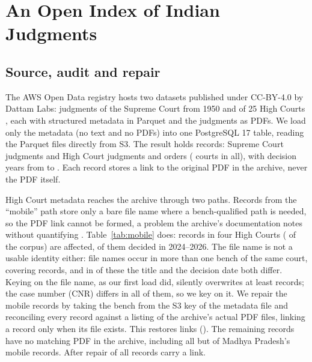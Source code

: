 \documentclass[conference]{IEEEtran}
\begin{document}
\section{An Open Index of Indian Judgments}
\label{sec:corpus}
\subsection{Source, audit and repair}
The AWS Open Data registry hosts two datasets published under CC-BY-4.0 by Dattam Labs: judgments of the Supreme Court from 1950 \cite{awssc} and of 25 High Courts \cite{awshc}, each with structured metadata in Parquet and the judgments as PDFs. We load only the metadata (no text and no PDFs) into one PostgreSQL 17 table, reading the Parquet files directly from S3. The result holds \CorpusTotal{} records: \CorpusSC{} Supreme Court judgments and \CorpusHC{} High Court judgments and orders (\CorpusCourts{} courts in all), with decision years from \CorpusYearMin{} to \CorpusYearMax. Each record stores a link to the original PDF in the archive, never the PDF itself.

High Court metadata reaches the archive through two paths. Records from the ``mobile'' path store only a bare file name where a bench-qualified path is needed, so the PDF link cannot be formed, a problem the archive's documentation notes without quantifying \cite{hcdatasetdoc}. Table~\ref{tab:mobile} does: \MobileTotal{} records in four High Courts (\MobilePct{} of the corpus) are affected, \MobileRecentPct{} of them decided in 2024--2026. The file name is not a usable identity either: \CollideStems{} file names occur in more than one bench of the same court, covering \CollideRows{} records, and in \CollideDiffBothPct{} of these the title and the decision date both differ. Keying on the file name, as our first load did, silently overwrites at least \CollideLost{} records; the case number (CNR) differs in all of them, so we key on it. We repair the mobile records by taking the bench from the S3 key of the metadata file and reconciling every record against a listing of the archive's actual PDF files, linking a record only when its file exists. This restores \MobileLinked{} links (\MobileLinkedPct). The remaining \MobileUnrecov{} records have no matching PDF in the archive, including all but \MPLinked{} of Madhya Pradesh's \MPMobile{} mobile records. After repair \LinkedPct{} of all records carry a link.

\begin{table}[t]
\caption{High Court records from the archive's mobile path, and the links restored by reconciliation against the archive's file listing.}
\label{tab:mobile}
\centering

\end{table}
\end{document}
